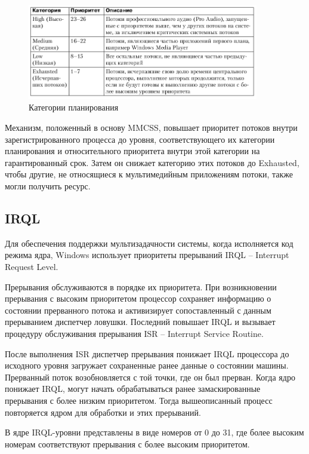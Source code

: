 \documentclass[a4paper,oneside,14pt]{extarticle}
\begin{document}
\begin{figure}[h]
	\centering
	\includegraphics[width=0.9\textwidth]{img/6 (2).png}
    \caption{Категории планирования}
	\label{img:6}
\end{figure}

Механизм, положенный в основу MMCSS, повышает приоритет потоков внутри зарегистрированного процесса до уровня, соответствующего их категории планирования и относительного приоритета внутри этой категории на гарантированный срок.
Затем он снижает категорию этих потоков до Exhausted, чтобы другие, не относящиеся к мультимедийным приложениям потоки, также могли получить ресурс.

\subsection*{IRQL}

Для обеспечения поддержки мультизадачности системы, когда исполняется код режима ядра, Windows использует приоритеты прерываний IRQL --  Interrupt Request Level.

Прерывания обслуживаются в порядке их приоритета. При возникновении прерывания с высоким приоритетом процессор сохраняет информацию о состоянии прерванного потока и активизирует сопоставленный с данным прерыванием диспетчер ловушки. Последний повышает IRQL и вызывает
процедуру обслуживания прерывания ISR -- Interrupt Service Routine.

После выполнения ISR диспетчер прерывания понижает IRQL процессора до исходного уровня загружает сохраненные ранее данные о состоянии машины. Прерванный поток возобновляется с той точки, где он был прерван. Когда ядро понижает IRQL, могут начать обрабатываться ранее замаскированные прерывания с более низким приоритетом. Тогда вышеописанный процесс повторяется ядром для обработки и этих прерываний.

В ядре IRQL-уровни представлены в виде номеров от 0 до 31, где более высоким номерам соответствуют прерывания с более высоким приоритетом.
\end{document}
